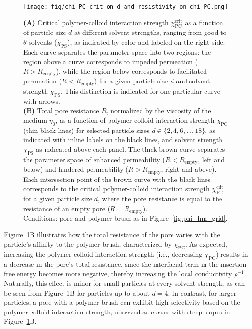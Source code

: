 \documentclass[12pt, a4paper]{article}
\begin{document}
\begin{figure}
    \centering
    \texttt{[image: fig/chi\_PC\_crit\_on\_d\_and\_resistivity\_on\_chi\_PC.png]}
    \caption{
        \textbf{(A)} Critical polymer-colloid interaction strength $\chi_{\textrm{PC}}^{\textrm{crit}}$ as a function of particle size $d$ at different solvent strengths, ranging from good to $\theta$-solvents ($\chi_{\textrm{PS}}$), as indicated by color and labeled on the right side.
        Each curve separates the parameter space into two regions: the region above a curve corresponds to impeded permeation ($R > R_{\text{empty}}$), while the region below corresponds to facilitated permeation ($R < R_{\text{empty}}$) for a given particle size $d$ and solvent strength $\chi_{\textrm{PS}}$.
        This distinction is indicated for one particular curve with arrows.
        \\
        \textbf{(B)} Total pore resistance $R$, normalized by the viscosity of the medium $\eta_0$, as a function of polymer-colloid interaction strength $\chi_{\textrm{PC}}$ (thin black lines) for selected particle sizes $d \in \{2, 4, 6, \dots, 18\}$, as indicated with inline labels on the black lines, and solvent strength $\chi_{\textrm{PS}}$ as indicated above each panel.
        The thick brown curve separates the parameter space of enhanced permeability ($R < R_{\textrm{empty}}$, left and below) and hindered permeability ($R > R_{\textrm{empty}}$, right and above).
        Each intersection point of the brown curve with the black lines corresponds to the critical polymer-colloid interaction strength $\chi_{\textrm{PC}}^{\textrm{crit}}$ for a given particle size $d$, where the pore resistance is equal to the resistance of an empty pore ($R = R_{\textrm{empty}}$).
        \\
        Conditions: pore and polymer brush as in Figure~\ref{fig:phi_hm_grid}.
    }
    \label{fig:R_vs_chi_PC}
\end{figure}

Figure~\ref{fig:R_vs_chi_PC}B illustrates how the total resistance of the pore varies with the particle's affinity to the polymer brush, characterized by $\chi_{\textrm{PC}}$.
As expected, increasing the polymer-colloid interaction strength (i.e., decreasing $\chi_{\textrm{PC}}$) results in a decrease in the pore's total resistance, since the interfacial term in the insertion free energy becomes more negative, thereby increasing the local conductivity $\rho^{-1}$.
Naturally, this effect is minor for small particles at every solvent strength, as can be seen from Figure~\ref{fig:R_vs_chi_PC}B for particles up to about $d = 4$.
In contrast, for larger particles, a pore with a polymer brush can exhibit high selectivity based on the polymer-colloid interaction strength, observed as curves with steep slopes in Figure~\ref{fig:R_vs_chi_PC}B.
\end{document}
